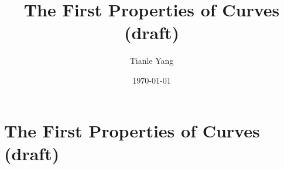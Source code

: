 \documentclass{noteformyself}
\title{The First Properties of Curves (draft)}
\author{Tianle Yang}
\date{\today}
\begin{document}
    \maketitle

    \section{The First Properties of Curves (draft)}



\end{document}
